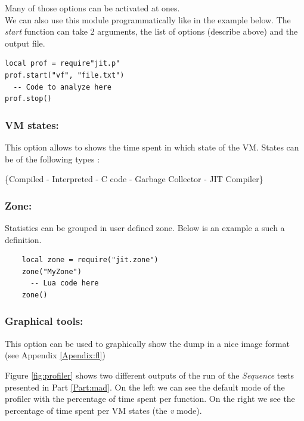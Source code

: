  Many of those options can be activated at ones.\\

We can also use this module programmatically like in the example below. The
\emph{start} function can take 2 arguments, the list of options (describe above)
and the output file.
\begin{lstlisting}[style=LuaStyle]
local prof = require"jit.p"
prof.start("vf", "file.txt")
  -- Code to analyze here
prof.stop()
\end{lstlisting}

\subsubsection{VM states:}
This option allows to shows the time spent in which state of the VM.
States can be of the following types :

\{Compiled - Interpreted - C code - Garbage Collector - JIT Compiler\} \\

\subsubsection{Zone:}
Statistics can be grouped in user defined zone. Below is an example a such a
definition.
\begin{lstlisting}
    local zone = require("jit.zone")
    zone("MyZone")
      -- Lua code here
    zone()
\end{lstlisting}

\subsubsection{Graphical tools:}
This option can be used to graphically show the dump in a nice image format
(see Appendix \ref{Apendix:fl})

Figure \ref{fig:profiler} shows two different outputs of the run of the
\emph{Sequence} tests presented in Part \ref{Part:mad}. On the left we can see
the default mode of the profiler with the percentage of time spent per function.
On the right we see the percentage of time spent per VM states (the \emph{v} mode).

